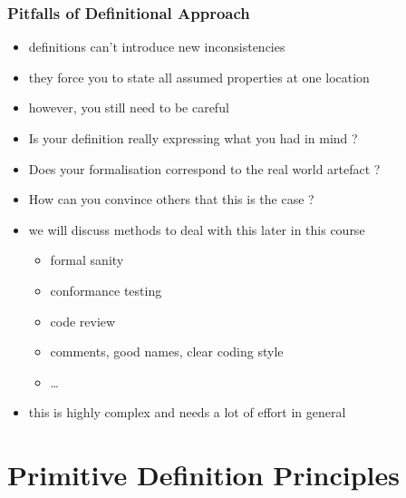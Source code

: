 \begin{frame}
\frametitle{Pitfalls of Definitional Approach}
\begin{itemize}
\item definitions can't introduce new inconsistencies
\item they force you to state all assumed properties at one location
\item however, you still need to be careful
\item Is your definition really expressing what you had in mind ?
\item Does your formalisation correspond to the real world artefact ?
\item How can you convince others that this is the case ?
\item we will discuss methods to deal with this later in this course
\begin{itemize}
\item formal sanity
\item conformance testing
\item code review
\item comments, good names, clear coding style
\item \ldots
\end{itemize}
\item this is highly complex and needs a lot of effort in general
\end{itemize}
\end{frame}



\section{Primitive Definition Principles}

